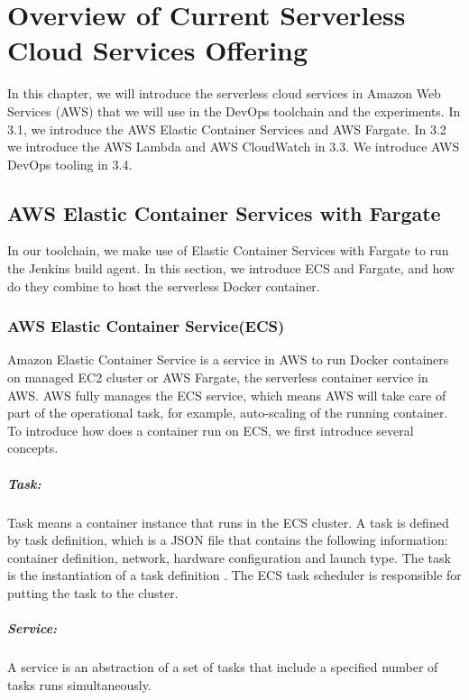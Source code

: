 \chapter{Overview of Current Serverless Cloud Services Offering}
In this chapter, we will introduce the serverless cloud services in Amazon Web Services (AWS) that we will use in the DevOps toolchain and the experiments.
 In 3.1, we introduce the AWS Elastic Container Services and AWS Fargate. In 3.2 we introduce the AWS Lambda and AWS CloudWatch in 3.3. We introduce AWS DevOps tooling in 3.4.
\section{AWS Elastic Container Services with Fargate}
In our toolchain, we make use of Elastic Container Services with Fargate to run the Jenkins build agent. In this section, we introduce ECS and Fargate, and how do they combine to host the serverless Docker container.
\subsection{AWS Elastic Container Service(ECS)}
Amazon Elastic Container Service is a service in AWS to run Docker containers on managed EC2 cluster or AWS Fargate, the serverless container service in AWS. AWS fully manages the ECS service, which means AWS will take care of part of the operational task, for example, auto-scaling of the running container. To introduce how does a container run on ECS, we first introduce several concepts.
\paragraph{Task:} Task means a container instance that runs in the ECS cluster. A task is defined by task definition, which is a JSON file that contains the following information: container definition, network, hardware configuration and launch type. The task is the instantiation of a task definition \cite{WhatisAm71:online}. The ECS task scheduler is responsible for putting the task to the cluster. 
\paragraph{Service:} A service is an abstraction of a set of tasks that include a specified number of tasks runs simultaneously.
